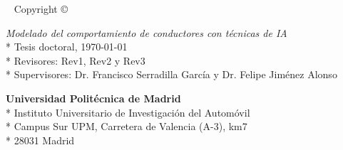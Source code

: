 \newpage
\begin{fullwidth}
~\vfill
\thispagestyle{empty}
\setlength{\parindent}{0pt}
\setlength{\parskip}{\baselineskip}
Copyright \copyright\ \the\year\ \thanklessauthor

\par{
	\textit{Modelado del comportamiento de conductores con técnicas de IA}\\*
	Tesis doctoral, \today\\*
	Revisores: Rev1, Rev2 y Rev3\\*
	Supervisores: Dr. Francisco Serradilla García y Dr. Felipe Jiménez Alonso
	}

\par{
	\textbf{Universidad Politécnica de Madrid}\\*
	Instituto Universitario de Investigación del Automóvil\\*
	Campus Sur UPM, Carretera de Valencia (A-3), km7\\*
	28031 Madrid
}



\end{fullwidth}

